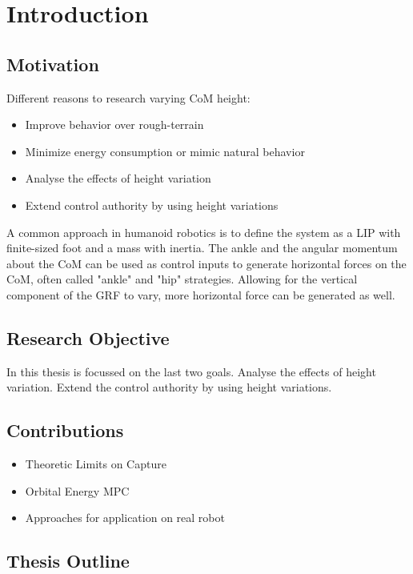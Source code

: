 %
\chapter{Introduction} \label{chap::intro}
\section{Motivation}

Different reasons to research varying \ac{CoM} height: 
\begin{itemize}
	\item Improve behavior over rough-terrain
	\item Minimize energy consumption or mimic natural behavior
	\item Analyse the effects of height variation
	\item Extend control authority by using height variations
\end{itemize}
A common approach in humanoid robotics is to define the system as a \ac{LIP} with finite-sized foot and a mass with inertia. The ankle and the angular momentum about the \ac{CoM} can be used as control inputs to generate horizontal forces on the \ac{CoM}, often called "ankle" and "hip" strategies. Allowing for the vertical component of the \ac{GRF} to vary, more horizontal force can be generated as well.
\section{Research Objective}
In this thesis is focussed on the last two goals. Analyse the effects of height variation. Extend the control authority by using height variations. 

\section{Contributions}
\begin{itemize}
	\item Theoretic Limits on Capture
	\item Orbital Energy MPC
	\item Approaches for application on real robot
\end{itemize}
\section{Thesis Outline}


